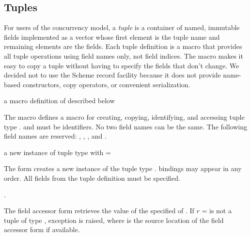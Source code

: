 \subsection {Tuples}

For users of the concurrency model, a \emph{tuple} is a
container of named, immutable fields implemented as a vector whose
first element is the tuple name and remaining elements are the
fields. Each tuple definition is a macro that provides all tuple
operations using field names only, not field indices. The macro makes
it easy to copy a tuple without having to specify the fields that
don't change.  We decided not to use the Scheme record facility
because it does not provide name-based constructors, copy operators,
or convenient serialization.

\begin{syntax}
\end{syntax}
\expandsto{} a macro definition of  described below

The  macro defines a macro for creating,
copying, identifying, and accessing tuple type . 
and  \etc{} must be identifiers. No two field names can be
the same. The following field names are reserved: ,
, , and .

\begin{syntax}
\end{syntax}
\returns{} a new instance of tuple type  with  =
 \etc{}

The  form creates a new instance of the tuple type
.  bindings may appear in any order. All fields
from the tuple definition must be specified.

\begin{syntax}
\end{syntax}
\returns{} .

The field accessor form retrieves the value of the specified
 of . If $r$ =  is not a tuple
of type , exception  is raised, where  is the source location of the
field accessor form if available.


